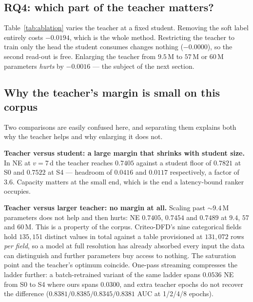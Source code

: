 \documentclass[runningheads]{llncs}
\begin{document}
\subsection{RQ4: which part of the teacher matters?}\label{sec:ablation}

\begin{table}[t]
\caption{Teacher design, student fixed at S2. $\Delta$ is against the default teacher}
\label{tab:ablation}
\centering\small

\end{table}

Table~\ref{tab:ablation} varies the teacher at a fixed student. Removing the soft label entirely
costs $-0.0194$, which is the whole method. Restricting the teacher to train only the head the
student consumes changes nothing ($-0.0000$), so the second read-out is free. Enlarging the teacher
from $9.5$\,M to $57$\,M or $60$\,M parameters \emph{hurts} by $-0.0016$ --- the subject of the next
section.

\subsection{Why the teacher's margin is small on this corpus}\label{sec:headroom}

Two comparisons are easily confused here, and separating them explains both why the teacher helps
and why enlarging it does not.

\smallskip\noindent\textbf{Teacher versus student: a large margin that shrinks with student size.}
In NE at $v=7$\,d the teacher reaches $0.7405$ against a student floor of $0.7821$ at S0 and
$0.7522$ at S4 --- headroom of $0.0416$ and $0.0117$ respectively, a factor of $3.6$. Capacity
matters at the small end, which is the end a latency-bound ranker occupies.

\smallskip\noindent\textbf{Teacher versus larger teacher: no margin at all.} Scaling past
$\sim\!9.4$\,M parameters does not help and then hurts: NE $0.7405$, $0.7454$ and $0.7489$ at
$9.4$, $57$ and $60$\,M. This is a property of the corpus. Criteo-DFD's nine categorical fields hold
$135{,}151$ distinct values in total against a table provisioned at $131{,}072$ rows \emph{per
field}, so a model at full resolution has already absorbed every input the data can distinguish and
further parameters buy access to nothing. The saturation point and the teacher's optimum coincide.
One-pass streaming compresses the ladder further: a batch-retrained variant of the same ladder spans
$0.0536$ NE from S0 to S4 where ours spans $0.0300$, and extra teacher epochs do not recover the
difference ($0.8381/0.8385/0.8345/0.8381$ AUC at 1/2/4/8 epochs).
\end{document}
